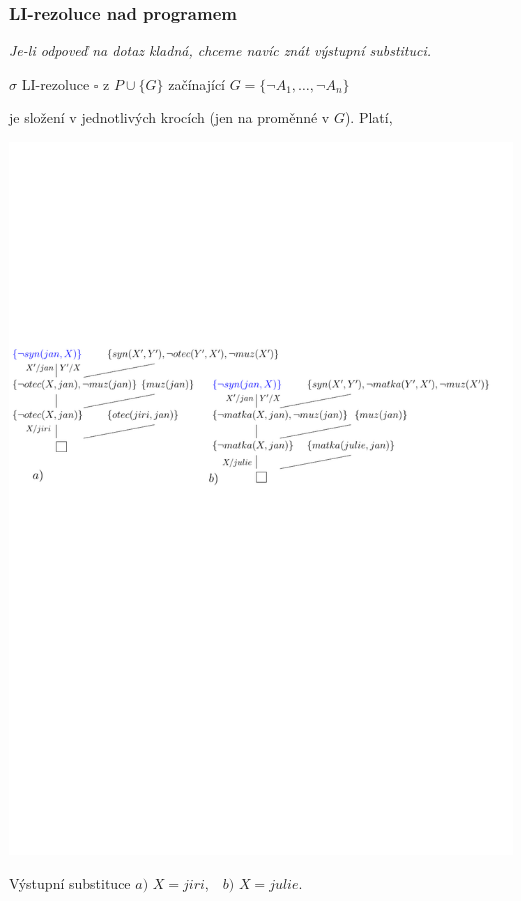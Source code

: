     
    
    \subsubsection*{LI-rezoluce nad programem}
    {\it Je-li odpoveď na dotaz kladná, chceme navíc znát výstupní substituci.}
    \medskip
    
     $\sigma$ LI-rezoluce $\square$ z $P\cup\{G\}$ začínající $G=\{\neg A_1,\dots,\neg A_n\}$
    \smallskip
    
    je složení  v jednotlivých krocích (jen na proměnné v $G$). Platí,
    \vspace{-2mm}
    
    \vspace{-2mm}
    
    \centerline{\includegraphics[scale=0.63]{files/rezolucePLprogramLI}}
    \bigskip
    
    Výstupní substituce $a)$ $X=jiri$,\ \ $b)$ $X=julie$.
    
    



